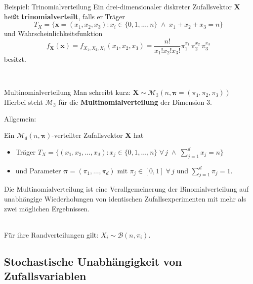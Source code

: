 \documentclass[
  10pt,
  ignorenonframetext,
]{beamer}
\providecommand{\tightlist}{%
  \setlength{\itemsep}{0pt}\setlength{\parskip}{0pt}}
\begin{document}
\begin{frame}{Beispiel: Trinomialverteilung}
\protect\hypertarget{beispiel-trinomialverteilung-1}{}
Ein drei-dimensionaler diskreter Zufallsvektor \(\symbf{X}\) heißt
\textbf{trinomialverteilt}, falls er Träger
\[T_X = \{ \symbf{x}=(x_1,x_2,x_3): x_i \in \{0,1,..., n\} \;\land\;
x_1+x_2+x_3=n\}\] und Wahrscheinlichkeitsfunktion \[
f_{\symbf{X}}(\symbf{x}) = f_{X_1, X_2, X_3}(x_1, x_2, x_3) = \frac{n!}{x_1!x_2!x_3!}
\pi_1^{x_1} \, \pi_2^{x_2} \, \pi_3^{x_3}
\] besitzt.\\
\strut \\
\end{frame}

\begin{frame}{Multinomialverteilung}
\protect\hypertarget{multinomialverteilung}{}
Man schreibt kurz:
\(\symbf{X} \sim {\mathcal M}_3(n ,\symbf{\pi}=(\pi_1,\pi_2,\pi_3))\)\\
Hierbei steht \({\mathcal M}_3\) für die \textbf{Multinomialverteilung}
der Dimension 3.

Allgemein:

Ein \({\mathcal M}_d(n, \symbf\pi)\)-verteilter Zufallsvektor
\(\symbf{X}\) hat

\begin{itemize}
\tightlist
\item
  Träger
  \(T_X = \{(x_1, x_2, \dots, x_d): x_j \in \{0, 1, \dots, n\} \;\forall\, j \;\land\; \sum^d_{j=1} x_j = n\}\)
\item
  und Parameter \(\symbf\pi = (\pi_1, \dots, \pi_d)\) mit
  \(\pi_j \in [0, 1] \;\forall\, j\) und \(\sum^d_{j=1} \pi_j = 1\).
\end{itemize}

Die Multinomialverteilung ist eine Verallgemeinerung der
Binomialverteilung auf unabhängige Wiederholungen von identischen
Zufallsexperimenten mit mehr als zwei möglichen Ergebnissen.\\
\strut \\

Für ihre Randverteilungen gilt: \(X_i \sim {\mathcal B}(n, \pi_i)\).
\end{frame}

\hypertarget{stochastische-unabhuxe4ngigkeit-von-zufallsvariablen}{%
\subsection{Stochastische Unabhängigkeit von
Zufallsvariablen}\label{stochastische-unabhuxe4ngigkeit-von-zufallsvariablen}}
\end{document}
